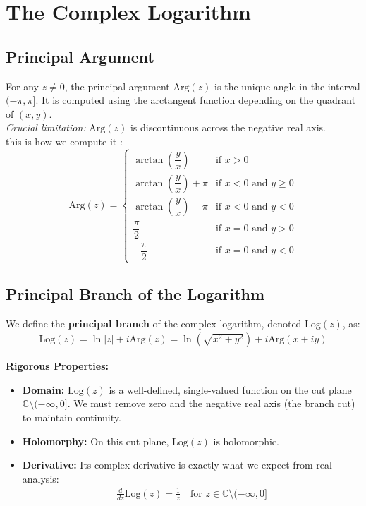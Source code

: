 \documentclass[a4paper,11pt]{article}
\begin{document}
\section{The Complex Logarithm}
\subsection{Principal Argument}
For any $z \neq 0$, the principal argument $\text{Arg}(z)$ is the unique angle in the interval $(-\pi, \pi]$. It is computed using the arctangent function depending on the quadrant of $(x,y)$. 
\\ \textit{Crucial limitation:} $\text{Arg}(z)$ is discontinuous across the negative real axis. \\
this is how we compute it : 
\[
\text{Arg}(z) =
\begin{cases}
\arctan\left(\dfrac{y}{x}\right) & \text{if } x > 0 \\[6pt]
\arctan\left(\dfrac{y}{x}\right) + \pi & \text{if } x < 0 \text{ and } y \ge 0 \\[6pt]
\arctan\left(\dfrac{y}{x}\right) - \pi & \text{if } x < 0 \text{ and } y < 0 \\[6pt]
\dfrac{\pi}{2} & \text{if } x = 0 \text{ and } y > 0 \\[6pt]
-\dfrac{\pi}{2} & \text{if } x = 0 \text{ and } y < 0
\end{cases}
\]
\subsection{Principal Branch of the Logarithm}
We define the \textbf{principal branch} of the complex logarithm, denoted $\text{Log}(z)$, as:
\begin{align*}
    \text{Log}(z) = \ln|z| + i \text{Arg}(z) = \ln\left(\sqrt{x^2 + y^2}\right) + i \text{Arg}(x+iy)
\end{align*}

\textbf{Rigorous Properties:}
\begin{itemize}
    \item \textbf{Domain:} $\text{Log}(z)$ is a well-defined, single-valued function on the cut plane $\mathbb{C} \setminus (-\infty, 0]$. We must remove zero and the negative real axis (the branch cut) to maintain continuity.
    \item \textbf{Holomorphy:} On this cut plane, $\text{Log}(z)$ is holomorphic.
    \item \textbf{Derivative:} Its complex derivative is exactly what we expect from real analysis: 
    \begin{align*}
        \frac{d}{dz}\text{Log}(z) = \frac{1}{z} \quad \text{for } z \in \mathbb{C} \setminus (-\infty, 0]
    \end{align*}
\end{itemize}
\end{document}
